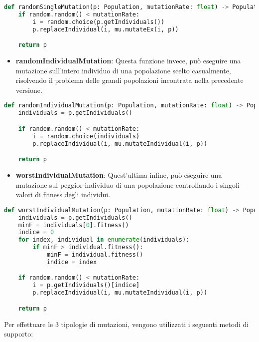 \documentclass{article}
\begin{document}
\begin{lstlisting}[language=Python]
def randomSingleMutation(p: Population, mutationRate: float) -> Population:
    if random.random() < mutationRate:
        i = random.choice(p.getIndividuals())
        p.replaceIndividual(i, mu.mutateEx(i, p))

    return p
\end{lstlisting}

\begin{itemize}
\item\textbf{randomIndividualMutation}: Questa funzione invece, può eseguire una mutazione sull'intero individuo di una popolazione scelto casualmente, risolvendo il problema delle grandi popolazioni incontrata nella precedente versione.
\end{itemize}

\begin{lstlisting}[language=Python]
def randomIndividualMutation(p: Population, mutationRate: float) -> Population:
    individuals = p.getIndividuals()

    if random.random() < mutationRate:
        i = random.choice(individuals)
        p.replaceIndividual(i, mu.mutateIndividual(i, p))

    return p
\end{lstlisting}


\begin{itemize}
\item\textbf{worstIndividualMutation}: Quest'ultima infine, può eseguire una mutazione sul peggior individuo di una popolazione controllando i singoli valori di fitness degli individui.
\end{itemize}

\begin{lstlisting}[language=Python]
def worstIndividualMutation(p: Population, mutationRate: float) -> Population:
    individuals = p.getIndividuals()
    minF = individuals[0].fitness()
    indice = 0
    for index, individual in enumerate(individuals):
        if minF > individual.fitness():
            minF = individual.fitness()
            indice = index

    if random.random() < mutationRate:
        i = p.getIndividuals()[indice]
        p.replaceIndividual(i, mu.mutateIndividual(i, p))

    return p
        \end{lstlisting}

\pagebreak

Per effettuare le 3 tipologie di mutazioni, vengono utilizzati i seguenti metodi di supporto:
\end{document}
